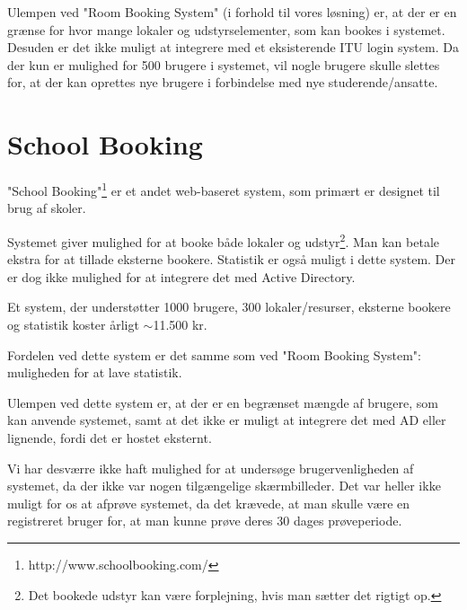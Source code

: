 Ulempen ved "Room Booking System" (i forhold til vores løsning) er, at der er en grænse for hvor mange lokaler og udstyrselementer, som kan bookes i systemet. Desuden er det ikke muligt at integrere med et eksisterende ITU login system. Da der kun er mulighed for 500 brugere i systemet, vil nogle brugere skulle slettes for, at der kan oprettes nye brugere i forbindelse med nye studerende/ansatte.

\section{School Booking}
\label{Comparison_SB}
"School Booking"\footnote{http://www.schoolbooking.com/} er et andet web-baseret system, som primært er designet til brug af skoler. 

Systemet giver mulighed for at booke både lokaler og udstyr\footnote{Det bookede udstyr kan være forplejning, hvis man sætter det rigtigt op.}. Man kan betale ekstra for at tillade eksterne bookere. Statistik er også muligt i dette system. Der er dog ikke mulighed for at integrere det med Active Directory.

Et system, der understøtter 1000 brugere, 300 lokaler/resurser, eksterne bookere og statistik koster årligt $\sim$11.500 kr.

Fordelen ved dette system er det samme som ved "Room Booking System": muligheden for at lave statistik.

Ulempen ved dette system er, at der er en begrænset mængde af brugere, som kan anvende systemet, samt at det ikke er muligt at integrere det med AD eller lignende, fordi det er hostet eksternt.

Vi har desværre ikke haft mulighed for at undersøge brugervenligheden af systemet, da der ikke var nogen tilgængelige skærmbilleder.  Det var heller ikke muligt for os at afprøve systemet, da det krævede, at man skulle være en registreret bruger for, at man kunne prøve deres 30 dages prøveperiode.